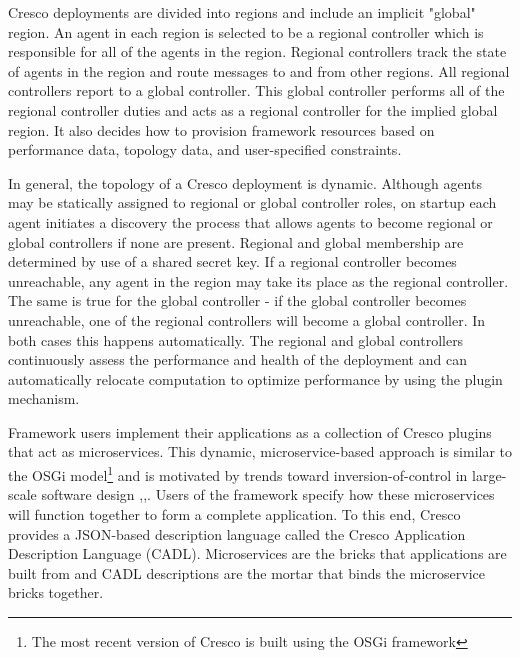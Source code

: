 \documentclass[conference]{IEEEtran}
\begin{document}
	Cresco deployments are divided into regions and include an implicit "global" region. An agent in each region is selected to be a regional controller which is responsible for all of the agents in the region. Regional controllers track the state of  agents in the region and route messages to and from other regions. All regional controllers report to a global controller. This global controller performs all of the regional controller duties and acts as a regional controller for the implied global region. It also decides how to provision framework resources based on performance data, topology data, and user-specified constraints.
	
	In general, the topology of a Cresco deployment is dynamic. Although agents may be statically assigned to regional or global controller roles, on startup each agent initiates a discovery the process that allows agents to become regional or global controllers if none are present. Regional and global membership are determined by use of a shared secret key. If a regional controller becomes unreachable, any agent in the region may take its place as the regional controller. The same is true for the global controller - if the global controller becomes unreachable, one of the regional controllers will become a global controller. In both cases this happens automatically. The regional and global controllers continuously assess the performance and health of the deployment and can automatically relocate computation to optimize performance by using the plugin mechanism.
	
    Framework users implement their applications as a collection of Cresco plugins that act as microservices. This dynamic, microservice-based approach is similar to the OSGi model\footnote{The most recent version of Cresco is built using the OSGi framework} and is motivated by trends toward inversion-of-control in large-scale software design \cite{osgi},\cite{spring},\cite{kubernetes}. Users of the framework specify how these microservices will function together to form a complete application. To this end, Cresco provides a JSON-based description language called the Cresco Application Description Language (CADL). Microservices are the bricks that applications are built from and CADL descriptions are the mortar that binds the microservice bricks together.
    
\end{document}
